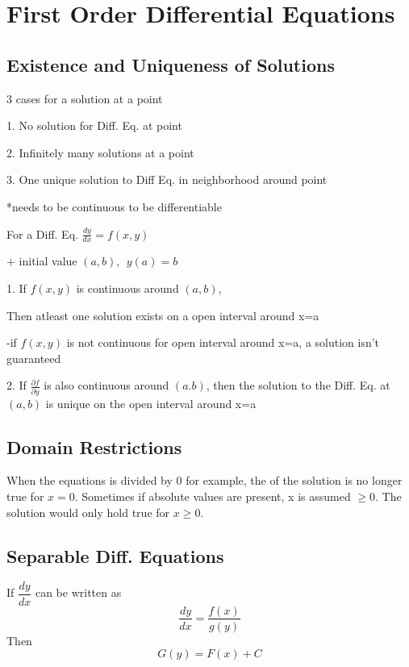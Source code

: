 \documentclass[12pt]{article}
\numberwithin{equation}{subsection}
\newcommand{\pary}[1]{\frac{\partial #1}{\partial y}}
\newcommand{\derx}[1]{\frac{d #1}{dx}}
\newcommand{\inda}{\hspace{.5cm}}
\newcommand{\indb}{\hspace{1cm}}
\newcommand{\indc}{\hspace{1.5cm}}
\begin{document}
\tableofcontents


\newpage
\section{First Order Differential Equations}
\subsection{Existence and Uniqueness of Solutions}
\smallskip

3 cases for a solution at a point

\inda 1. No solution for Diff. Eq. at point 

\inda 2. Infinitely many solutions at a point 

\inda 3. One unique solution to Diff Eq. in neighborhood around point

\indc *needs to be continuous to be differentiable

\bigskip

\noindent For a Diff. Eq. $ \derx{y} = f(x,y) $

\indc $+$ initial value $(a,b), \ \ y(a)=b$

\bigskip

1. If $f(x,y)$ is continuous around $(a,b)$,

\inda Then atleast one solution exists on a open interval around x=a

\indb -if $f(x,y)$ is not continuous for open interval around x=a, a solution isn't guaranteed 

\bigskip

\hangindent=1.25cm
2. If $\pary{f}$ is also continuous around $(a.b)$, then the solution to the Diff. Eq. at $(a,b)$ is unique on the open interval around x=a

\subsection{Domain Restrictions}
When the equations is divided by 0 for example, the of the solution is no longer true for $x=0$.
Sometimes if absolute values are present, x is assumed $\geq 0$. The solution would only hold true for $x \geq 0$.

\subsection{Separable Diff. Equations}

If $\dfrac{dy}{dx}$ can be written as 
\begin{equation}
\derx{y} = \frac{f(x)}{g(y)}\label{1}
\end{equation}
Then
\begin{equation}
G(y)=F(x)+C
\end{equation}
\end{document}
